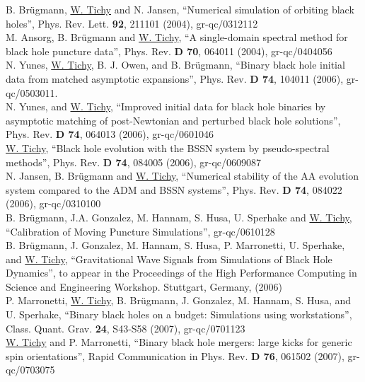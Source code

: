 B. Br\"ugmann, \underline{W. Tichy} and N. Jansen,
``Numerical simulation of orbiting black holes'',
Phys. Rev. Lett. {\bf 92}, 211101 (2004), gr-qc/0312112
\\

M. Ansorg, B. Br\"ugmann and \underline{W. Tichy},
``A single-domain spectral method for black hole puncture data'',
Phys. Rev. {\bf D 70}, 064011 (2004), gr-qc/0404056
\\

N. Yunes, \underline{W. Tichy}, B. J. Owen, and B. Br\"ugmann, 
``Binary black hole initial data from matched asymptotic expansions'',
Phys. Rev. {\bf D 74}, 104011 (2006), gr-qc/0503011.
\\

N. Yunes, and \underline{W. Tichy}, 
``Improved initial data for black hole binaries by asymptotic matching
of post-Newtonian and perturbed black hole solutions'',
Phys. Rev. {\bf D 74}, 064013 (2006), gr-qc/0601046
\\

\underline{W. Tichy}, 
``Black hole evolution with the BSSN system by pseudo-spectral methods'',
Phys. Rev. {\bf D 74}, 084005 (2006), gr-qc/0609087
\\

N. Jansen, B. Br\"ugmann and \underline{W. Tichy},
``Numerical stability of the AA evolution system compared to the ADM and
BSSN systems'', Phys. Rev. {\bf D 74}, 084022 (2006), gr-qc/0310100
\\

B. Br\"ugmann, J.A. Gonzalez, M. Hannam, S. Husa, U. Sperhake
and \underline{W. Tichy},
``Calibration of Moving Puncture Simulations'', gr-qc/0610128
\\

B. Br\"ugmann, J. Gonzalez, M. Hannam, 
S. Husa, P. Marronetti, U. Sperhake, and \underline{W. Tichy},
``Gravitational Wave Signals from Simulations of Black Hole
Dynamics'',
to appear in the Proceedings of the High Performance Computing
in Science and Engineering Workshop. Stuttgart, Germany, (2006)
\\

P. Marronetti, \underline{W. Tichy}, B. Br\"ugmann, J. Gonzalez, M. Hannam, 
S. Husa, and U. Sperhake,
``Binary black holes on a budget: Simulations using workstations'',
Class. Quant. Grav. {\bf 24}, S43-S58 (2007), gr-qc/0701123
\\

\underline{W. Tichy} and P. Marronetti,
``Binary black hole mergers: large kicks for generic spin orientations'',
Rapid Communication in Phys. Rev. {\bf D 76}, 061502 (2007),
gr-qc/0703075
\\

